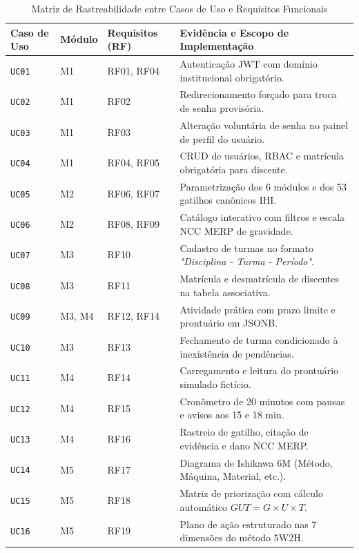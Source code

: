 \begin{table}[!ht]
\centering
\caption{Matriz de Rastreabilidade entre Casos de Uso e Requisitos Funcionais}
\label{tab_rastreabilidade_uc_rf}
\footnotesize
\begin{tabularx}{\textwidth}{p{2.2cm} p{1.6cm} p{2.4cm} X}
\toprule
\textbf{Caso de Uso} & \textbf{Módulo} & \textbf{Requisitos (RF)} & \textbf{Evidência e Escopo de Implementação} \\
\midrule
\texttt{UC01} & M1 & RF01, RF04 & Autenticação JWT com domínio institucional obrigatório. \\
\texttt{UC02} & M1 & RF02 & Redirecionamento forçado para troca de senha provisória. \\
\texttt{UC03} & M1 & RF03 & Alteração voluntária de senha no painel de perfil do usuário. \\
\texttt{UC04} & M1 & RF04, RF05 & CRUD de usuários, RBAC e matrícula obrigatória para discente. \\
\texttt{UC05} & M2 & RF06, RF07 & Parametrização dos 6 módulos e dos 53 gatilhos canônicos IHI. \\
\texttt{UC06} & M2 & RF08, RF09 & Catálogo interativo com filtros e escala NCC MERP de gravidade. \\
\texttt{UC07} & M3 & RF10 & Cadastro de turmas no formato \textit{"Disciplina - Turma - Período"}. \\
\texttt{UC08} & M3 & RF11 & Matrícula e desmatrícula de discentes na tabela associativa. \\
\texttt{UC09} & M3, M4 & RF12, RF14 & Atividade prática com prazo limite e prontuário em JSONB. \\
\texttt{UC10} & M3 & RF13 & Fechamento de turma condicionado à inexistência de pendências. \\
\texttt{UC11} & M4 & RF14 & Carregamento e leitura do prontuário simulado fictício. \\
\texttt{UC12} & M4 & RF15 & Cronômetro de 20 minutos com pausas e avisos aos 15 e 18 min. \\
\texttt{UC13} & M4 & RF16 & Rastreio de gatilho, citação de evidência e dano NCC MERP. \\
\texttt{UC14} & M5 & RF17 & Diagrama de Ishikawa 6M (Método, Máquina, Material, etc.). \\
\texttt{UC15} & M5 & RF18 & Matriz de priorização com cálculo automático $GUT = G \times U \times T$. \\
\texttt{UC16} & M5 & RF19 & Plano de ação estruturado nas 7 dimensões do método 5W2H. \\

\end{tabularx}
\end{table}
